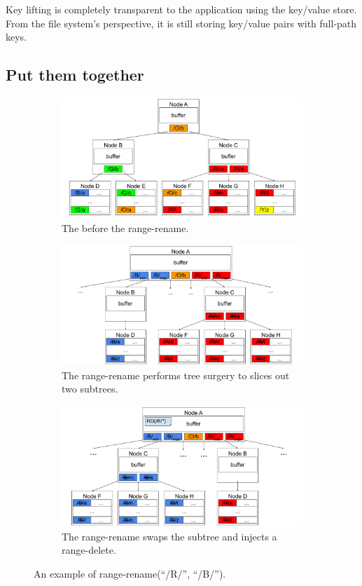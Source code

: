 Key lifting is completely transparent to the application using the key/value
store.
From the file system's perspective, it is still storing key/value pairs with
full-path keys.

\subsection{Put them together}

\begin{figure}
    \begin{subfigure}{\textwidth}
        \centering
        \includegraphics[width=.7\linewidth]{fig/rr-1}
        \caption{\label{subfig:rr-1} The \bet before the range-rename.}
    \end{subfigure}
    \begin{subfigure}{\textwidth}
        \centering
        \includegraphics[width=.7\linewidth]{fig/rr-2}
        \caption{\label{subfig:rr-2} The range-rename performs tree surgery
            to slices out two subtrees.}
    \end{subfigure}
    \begin{subfigure}{\textwidth}
        \centering
        \includegraphics[width=.7\linewidth]{fig/rr-3}
        \caption{\label{subfig:rr-3} The range-rename swaps the subtree and
            injects a range-delete.}
    \end{subfigure}
    \caption[A range-rename example]{\label{fig:rr}
        An example of range-rename(``/R/'', ``/B/'').}
\end{figure}

